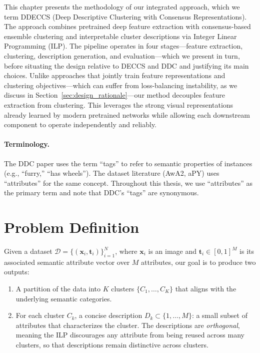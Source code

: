 \label{chap:methodology}

This chapter presents the methodology of our integrated approach, which we term DDECCS (Deep Descriptive Clustering with Consensus Representations). The approach combines pretrained deep feature extraction with consensus-based ensemble clustering and interpretable cluster descriptions via Integer Linear Programming (ILP). The pipeline operates in four stages---feature extraction, clustering, description generation, and evaluation---which we present in turn, before situating the design relative to DECCS and DDC and justifying its main choices. Unlike approaches that jointly train feature representations and clustering objectives---which can suffer from loss-balancing instability, as we discuss in Section~\ref{sec:design_rationale}---our method decouples feature extraction from clustering. This leverages the strong visual representations already learned by modern pretrained networks while allowing each downstream component to operate independently and reliably.

\paragraph{Terminology.} The DDC paper uses the term ``tags'' to refer to semantic properties of instances (e.g., ``furry,'' ``has wheels''). The dataset literature (AwA2, aPY) uses ``attributes'' for the same concept. Throughout this thesis, we use ``attributes'' as the primary term and note that DDC's ``tags'' are synonymous.

\section{Problem Definition}
\label{sec:problem_def}

Given a dataset $\mathcal{D} = \{(\mathbf{x}_i, \mathbf{t}_i)\}_{i=1}^{N}$, where $\mathbf{x}_i$ is an image and $\mathbf{t}_i \in [0,1]^M$ is its associated semantic attribute vector over $M$ attributes, our goal is to produce two outputs:

\begin{enumerate}
    \item A partition of the data into $K$ clusters $\{C_1, \ldots, C_K\}$ that aligns with the underlying semantic categories.
    \item For each cluster $C_k$, a concise description $D_k \subset \{1, \ldots, M\}$: a small subset of attributes that characterizes the cluster. The descriptions are \emph{orthogonal}, meaning the ILP discourages any attribute from being reused across many clusters, so that descriptions remain distinctive across clusters.
\end{enumerate}

